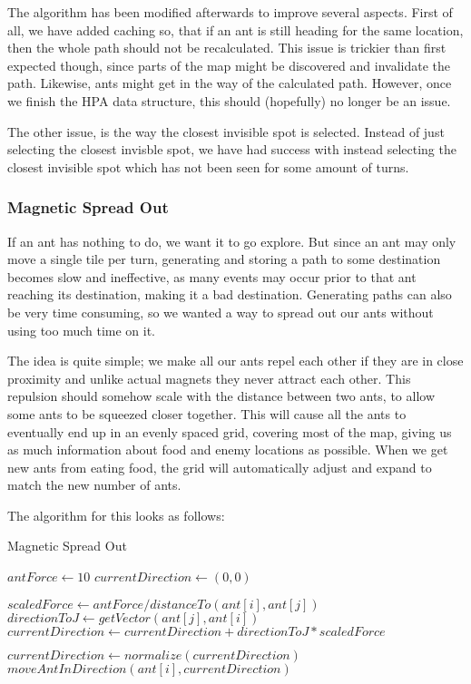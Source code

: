 The algorithm has been modified afterwards to improve several aspects. First of all, we have added caching so, that if an ant is still heading for the same location, then the whole path should not be recalculated. This issue is trickier than first expected though, since parts of the map might be discovered and invalidate the path. Likewise, ants might get in the way of the calculated path. However, once we finish the HPA data structure, this should (hopefully) no longer be an issue.

The other issue, is the way the closest invisible spot is selected. Instead of just selecting the closest invisble spot, we have had success with instead selecting the closest invisible spot which has not been seen for some amount of turns.

\subsubsection{Magnetic Spread Out}
If an ant has nothing to do, we want it to go explore. But since an ant may only move a single tile per turn, generating and storing a path to some destination becomes slow and ineffective, as many events may occur prior to that ant reaching its destination, making it a bad destination. Generating paths can also be very time consuming, so we wanted a way to spread out our ants without using too much time on it.

The idea is quite simple; we make all our ants repel each other if they are in close proximity and unlike actual magnets they never attract each other. This repulsion should somehow scale with the distance between two ants, to allow some ants to be squeezed closer together. This will cause all the ants to eventually end up in an evenly spaced grid, covering most of the map, giving us as much information about food and enemy locations as possible. When we get new ants from eating food, the grid will automatically adjust and expand to match the new number of ants.

The algorithm for this looks as follows:

\begin{algorithm}
\caption{Magnetic Spread Out}
\label{alg:magneticspreadout}
\begin{algorithmic}
\STATE $antForce \gets 10$
	\STATE $currentDirection \gets (0,0)$
	
		\STATE $scaledForce \gets antForce / distanceTo(ant[i],ant[j])$
		\STATE $directionToJ \gets getVector(ant[j],ant[i])$
		\STATE $currentDirection \gets currentDirection + directionToJ * scaledForce$
	\ENDFOR

	\STATE $currentDirection \gets normalize(currentDirection)$
	\STATE $moveAntInDirection(ant[i], currentDirection)$
\ENDFOR
\end{algorithmic}
\end{algorithm}

